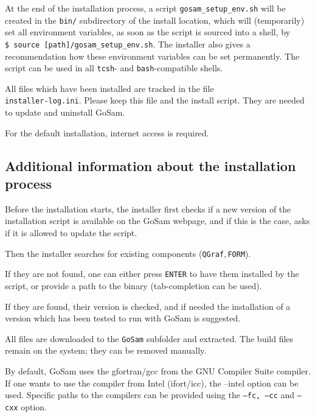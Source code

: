 \documentclass[11pt,a4paper]{refrep}
\newcommand{\gosam}{{\sc GoSam}\xspace}
\newcommand{\qgraf}{{\tt QGraf}\xspace}
\begin{document}
At the end of the installation process, 
a script {\tt gosam\_setup\_env.sh} will be created in the
{\tt bin/} subdirectory of the install location, 
which will (temporarily) set all environment
variables, as soon as the script is sourced into a shell,  
by \\
{\tt \$ source [path]/gosam\_setup\_env.sh}.
The installer also gives  a recommendation how
these environment variables can be set permanently.
The script can be used in all {\tt tcsh}- and {\tt bash}-compatible shells.

All  files which have been installed are tracked in the file \\
{\tt installer-log.ini}.
Please keep this file and the install script. They are needed to update and
uninstall \gosam. 

For the default installation, internet access is required.

\subsection{Additional information about the installation process}

Before the installation starts, the installer first checks if a new version of
the installation script is available on the \gosam webpage,  
and if this is the case, asks if it is allowed to update the script.

Then the installer searches for existing components (\qgraf,\,{\tt FORM}).

If they are not found, one can either 
press {\tt ENTER} to have them installed by the script, or provide a path to
the binary (tab-completion can be used).

If they are found, their version is checked, 
and if needed the installation
of a version which has been tested to run with \gosam{} is suggested.

All files are downloaded to the {\tt GoSam} subfolder and extracted.
The build files remain on the system; they can be removed manually.


By default, \gosam uses the gfortran/gcc from the GNU Compiler Suite compiler.
If one wants to use the compiler from Intel (ifort/icc), the --intel option can be used.
Specific paths to the compilers can be provided using the {\tt --fc, --cc} and 
{\tt --cxx} option.
\end{document}
